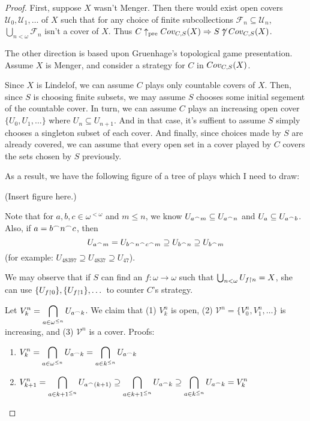   \begin{proof}
    First, suppose $X$ wasn't Menger. Then there would exist open covers $\mathcal{U}_0,\mathcal{U}_1,\dots$ of $X$ such that for any choice of finite subcollections $\mathcal{F}_n\subseteq\mathcal{U}_n$, $\bigcup_{n<\omega} \mathcal{F}_n$ isn't a cover of $X$. Thus $C\uparrow_{\text{pre}}Cov_{C,S}(X) \Rightarrow S \not\uparrow Cov_{C,S}(X)$.

    The other direction is based upon Gruenhage's topological game presentation. Assume $X$ is Menger, and consider a strategy for $C$ in $Cov_{C,S}(X)$.

    Since $X$ is Lindelof, we can assume $C$ plays only countable covers of $X$. Then, since $S$ is choosing finite subsets, we may assume $S$ chooses some initial segement of the countable cover. In turn, we can assume $C$ plays an increasing open cover $\{U_0,U_1,\dots\}$ where $U_n\subseteq U_{n+1}$. And in that case, it's suffient to assume $S$ simply chooses a singleton subset of each cover. And finally, since choices made by $S$ are already covered, we can assume that every open set in a cover played by $C$ covers the sets chosen by $S$ previously.

    As a result, we have the following figure of a tree of plays which I need to draw:

    (Insert figure here.)

    Note that for $a,b,c\in\omega^{<\omega}$ and $m\leq n$, we know $U_{a^\frown m}\subseteq U_{a^\frown n}$ and $U_a \subseteq U_{a^\frown b}$. Also, if $a=b^\frown n ^\frown c$, then \[U_{a^\frown m} = U_{b^\frown n ^\frown c ^\frown m} \supseteq U_{b^\frown n} \supseteq U_{b^\frown m}\] (for example: $U_{48397}\supseteq U_{4837} \supseteq U_{47}$).

    We may observe that if $S$ can find an $f:\omega\to\omega$ such that $\bigcup_{n<\omega}U_{f\restriction n} = X$, she can use $\{U_{f\restriction 0}\}, \{U_{f\restriction 1}\}, \dots$ to counter $C$'s strategy.

    Let $\displaystyle V_k^n = \bigcap_{a\in\omega^{\leq n}} U_{a^\frown k}$. We claim that (1) $V_k^n$ is open, (2) $\mathcal{V}^n=\{V_0^n,V_1^n,\dots\}$ is increasing, and (3) $\mathcal{V}^n$ is a cover. Proofs:

    \begin{enumerate}
      \item
      $\displaystyle V_k^n = \bigcap_{a\in\omega^{\leq n}} U_{a^\frown k} = \bigcap_{a\in k^{\leq n}} U_{a^\frown k}$

      \item
      $\displaystyle V_{k+1}^n = \bigcap_{a\in{k+1}^{\leq n}} U_{a^\frown (k+1)} \supseteq \bigcap_{a\in{k+1}^{\leq n}} U_{a^\frown k} \supseteq \bigcap_{a\in{k}^{\leq n}} U_{a^\frown k} = V_k^n$


\end{enumerate}
\end{proof}
